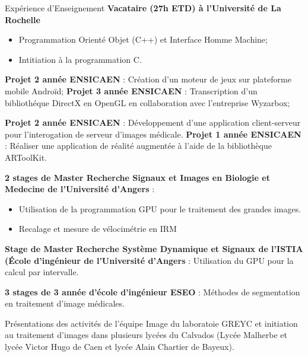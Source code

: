\begin{rubric}{Expérience d'Enseignement}
\entry*[2003-2004]
\textbf{Vacataire (27h ETD) à l'Université de La Rochelle}
\begin{itemize}
\item Programmation Orienté Objet (C++) et Interface Homme Machine;
\item Intitiation à la programmation C.
\end{itemize}

\entry*[2010-2011]
\textbf{Projet 2 année ENSICAEN} : Création d'un moteur de jeux sur plateforme mobile Androïd;
\textbf{Projet 3 année ENSICAEN} : Transcription d'un bibliothéque DirectX en OpenGL en collaboration avec l'entreprise Wyzarbox;


\entry*[2009-2010]
\textbf{Projet 2 année ENSICAEN} : Développement d'une application client-serveur pour l'interogation de serveur d'images médicale.
\entry*[2009-2010]
\textbf{Projet 1 année ENSICAEN} : Réaliser une application
de réalité augmentée à l'aide de la bibliothèque ARToolKit.

\entry*[03-08/2009]
\textbf{2 stages de Master Recherche Signaux et Images en Biologie et Medecine de l'Université d'Angers} : 
\begin{itemize}
  \item Utilisation de la programmation GPU pour le traitement des grandes images.
  \item Recalage et mesure de vélocimétrie en IRM
\end{itemize}

\entry*[03-08/2009]
\textbf{Stage de Master Recherche Système Dynamique et Signaux  de l'ISTIA (\'Ecole d'ingénieur de l'Université d'Angers} : Utilisation du GPU pour la calcul par intervalle.

\entry*[2005-2008]
\textbf{3 stages de 3 année d'école d'ingénieur ESEO} : Méthodes de segmentation en traitement d'image médicales.


\entry*[2009-2010]
Présentations des activités de l'équipe Image du laboratoie GREYC et
initiation au traitement d'images dans plusieurs lycées du Calvados
(Lycée Malherbe et lycée Victor Hugo de Caen et lycée Alain Chartier de Bayeux).

\end{rubric}

